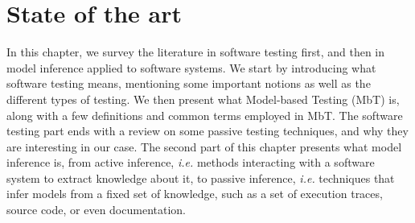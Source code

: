 %
\chapter{State of the art}
\label{sec:related}

In this chapter, we survey the literature in software testing
first, and then in model inference applied to software systems.
We start by introducing what software testing means, mentioning
some important notions as well as the different types of testing.
We then present what Model-based Testing (MbT) is, along with a
few definitions and common terms employed in MbT. The software
testing part ends with a review on some passive testing
techniques, and why they are interesting in our case. The second
part of this chapter presents what model inference is, from
active inference, \emph{i.e.} methods interacting with a software
system to extract knowledge about it, to passive inference,
\emph{i.e.} techniques that infer models from a fixed set of
knowledge, such as a set of execution traces, source code,
or even documentation.\\

\minitoc
\clearpage

\pagebreak





\cleardoublepage
